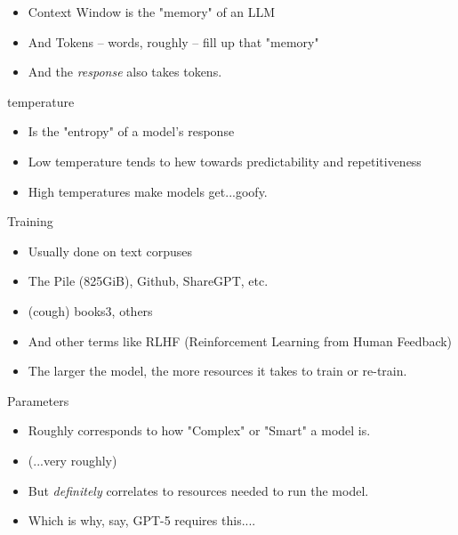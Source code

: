 \documentclass{beamer}
\begin{document}
\begin{frame}
	\begin{itemize}
		\item Context Window is the "memory" of an LLM
		\pause
		\item And Tokens -- words, roughly -- fill up that "memory"
		\pause
		\item And the \textit{response} also takes tokens.
	\end{itemize}
\end{frame}


\begin{frame}[plain]
\end{frame}

\begin{frame}{temperature}
	\begin{itemize}
		\item Is the "entropy" of a model's response
		\pause
		\item Low temperature tends to hew towards predictability and repetitiveness
		\pause
		\item High temperatures make models get...goofy. 
	\end{itemize}
\end{frame}

\begin{frame}{Training}
	\begin{itemize}
		\item Usually done on text corpuses
		\pause
		\item The Pile (825GiB), Github, ShareGPT, etc.
		\pause
		\item (cough) books3, others
		\pause
		\item And other terms like RLHF (Reinforcement Learning from Human Feedback)
		\pause
		\item The larger the model, the more resources it takes to train or re-train.
	\end{itemize}
\end{frame}

\begin{frame}{Parameters}
	\begin{itemize}
		\item Roughly corresponds to how "Complex" or "Smart" a model is.
		\pause
		\item (...very roughly)
		\pause 
		\item But \textit{definitely} correlates to resources needed to run the model.
		\pause
		\item Which is why, say, GPT-5 requires this....
	\end{itemize}
\end{frame}
\end{document}
